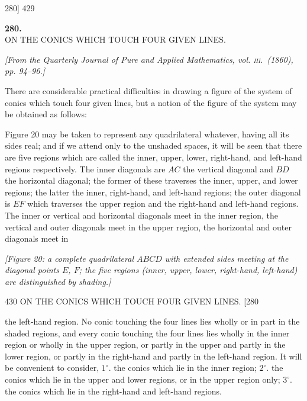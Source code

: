 \documentclass[11pt]{article}
\begin{document}
\begin{center}
\textsc{280]} \hfill \hfill 429
\end{center}

\begin{center}
\textbf{\large 280.}\\[1ex]
\textsc{ON THE CONICS WHICH TOUCH FOUR GIVEN LINES.}
\end{center}

\begin{center}
\textit{[From the Quarterly Journal of Pure and Applied Mathematics, vol. \textsc{iii}.\ (1860),
pp. 94--96.]}
\end{center}

\medskip

There are considerable practical difficulties in drawing a figure of the system of
conics which touch four given lines, but a notion of the figure of the system may be
obtained as follows:

Figure 20 may be taken to represent any quadrilateral whatever, having all its
sides real; and if we attend only to the unshaded spaces, it will be seen that there
are five regions which are called the inner, upper, lower, right-hand, and left-hand
regions respectively. The inner diagonals are $AC$ the vertical diagonal and $BD$ the
horizontal diagonal; the former of these traverses the inner, upper, and lower regions;
the latter the inner, right-hand, and left-hand regions; the outer diagonal is $EF$
which traverses the upper region and the right-hand and left-hand regions. The
inner or vertical and horizontal diagonals meet in the inner region, the vertical and
outer diagonals meet in the upper region, the horizontal and outer diagonals meet in

\medskip
\textit{[Figure 20: a complete quadrilateral $ABCD$ with extended sides meeting at the
diagonal points $E$, $F$; the five regions (inner, upper, lower, right-hand, left-hand)
are distinguished by shading.]}
\medskip

\begin{center}
430 \hfill ON THE CONICS WHICH TOUCH FOUR GIVEN LINES. \hfill \textsc{[280}
\end{center}

the left-hand region. No conic touching the four lines lies wholly or in part in the
shaded regions, and every conic touching the four lines lies wholly in the inner region
or wholly in the upper region, or partly in the upper and partly in the lower region,
or partly in the right-hand and partly in the left-hand region. It will be convenient
to consider, $1^{\circ}$. the conics which lie in the inner region; $2^{\circ}$. the
conics which lie in the upper and lower regions, or in the upper region only;
$3^{\circ}$. the conics which lie in the right-hand and left-hand regions.
\end{document}
